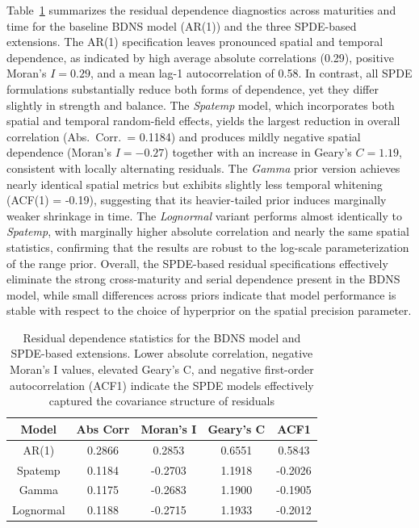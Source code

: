 \documentclass[
  12pt]{article}
\begin{document}
Table~\ref{residual} summarizes the residual dependence diagnostics across maturities and time for the baseline BDNS model (AR(1)) and the three SPDE-based extensions. The AR(1) specification leaves pronounced spatial and temporal dependence, as indicated by high average absolute correlations (0.29), positive Moran’s \( I = 0.29 \), and a mean lag-1 autocorrelation of 0.58. In contrast, all SPDE formulations substantially reduce both forms of dependence, yet they differ slightly in strength and balance. The \textit{Spatemp} model, which incorporates both spatial and temporal random-field effects, yields the largest reduction in overall correlation (Abs.\ Corr.\ = 0.1184) and produces mildly negative spatial dependence (Moran’s \( I = -0.27 \)) together with an increase in Geary’s \( C = 1.19 \), consistent with locally alternating residuals. The \textit{Gamma} prior version achieves nearly identical spatial metrics but exhibits slightly less temporal whitening (ACF(1) = -0.19), suggesting that its heavier-tailed prior induces marginally weaker shrinkage in time. The \textit{Lognormal} variant performs almost identically to \textit{Spatemp}, with marginally higher absolute correlation and nearly the same spatial statistics, confirming that the results are robust to the log-scale parameterization of the range prior. Overall, the SPDE-based residual specifications effectively eliminate the strong cross-maturity and serial dependence present in the BDNS model, while small differences across priors indicate that model performance is stable with respect to the choice of hyperprior on the spatial precision parameter.

\begin{table}[t!]
    \centering
    \caption{Residual dependence statistics for the BDNS model and SPDE-based extensions. Lower absolute correlation, negative Moran's I values, elevated Geary's C, and negative first-order autocorrelation (ACF1) indicate the SPDE models effectively captured the covariance structure of residuals}
    \begin{tabular}{|c|c|c|c|c|}
    \hline
        Model &  Abs Corr & Moran's I & Geary’s C & ACF1\\ \hline
        AR(1) &   0.2866 & 0.2853 & 0.6551 & 0.5843 \\ \hline
        Spatemp & 0.1184 & -0.2703 & 1.1918 & -0.2026 \\ \hline
        Gamma & 0.1175 & -0.2683 & 1.1900 & -0.1905 \\ \hline
        Lognormal & 0.1188 & -0.2715 & 1.1933 & -0.2012 \\ \hline
    \end{tabular}
    \label{residual}
\end{table}
\end{document}
